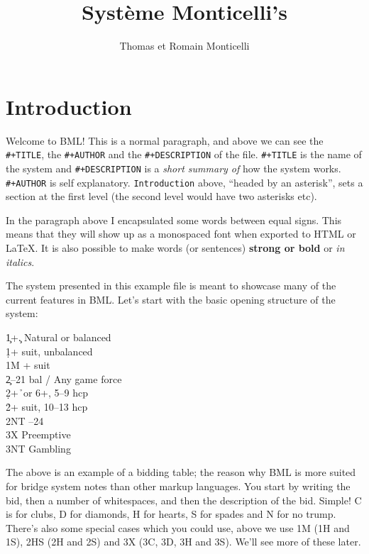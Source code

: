 \documentclass[a4paper]{article}
\title{Système Monticelli's}
\author{Thomas et Romain Monticelli}
\begin{document}
\maketitle
\tableofcontents

\section{Introduction}

Welcome to BML! This is a normal paragraph, and above we can see
the \texttt{\#+TITLE}, the \texttt{\#+AUTHOR} and the \texttt{\#+DESCRIPTION} of the file. \texttt{\#+TITLE} is
the name of the system and \texttt{\#+DESCRIPTION} is a \emph{short summary of} how
the system works. \texttt{\#+AUTHOR} is self explanatory. \texttt{Introduction} above,
``headed by an asterisk'', sets a section at the first level (the second
level would have two asterisks etc).

In the paragraph above I encapsulated some words between equal
signs. This means that they will show up as a monospaced font when
exported to HTML or LaTeX. It is also possible to make words (or
sentences) \textbf{strong or bold} or \emph{in italics}.

The system presented in this example file is meant to showcase many
of the current features in BML. Let's start with the basic opening
structure of the system:

\begin{bidtable}
1\c {}+\c . Natural or balanced\\
1\d {}+ suit, unbalanced\\
1M + suit\\
2\c {}--21 bal / Any game force\\
2\d {}+\h\ or 6+\s , 5--9 hcp\\
2\h\s {}+ suit, 10--13 hcp\\
2NT --24\\
3X \> Preemptive\\
3NT \> Gambling
\end{bidtable}

The above is an example of a bidding table; the reason why BML is
more suited for bridge system notes than other markup languages. You
start by writing the bid, then a number of whitespaces, and then the
description of the bid. Simple! C is for clubs, D for diamonds, H
for hearts, S for spades and N for no trump. There's also some
special cases which you could use, above we use 1M (1H and 1S), 2HS
(2H and 2S) and 3X (3C, 3D, 3H and 3S). We'll see more of these
later.
\end{document}
